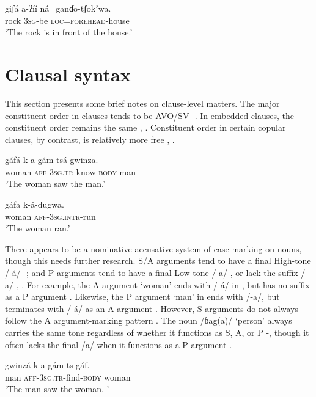 \documentclass[output=paper]{langsci/langscibook}
\begin{document}
\ea\label{ex:ahlandc:65}
\gll
giʃá   a-ʔíí    ná=ganɗo-tʃokʼwa.   \\ 
rock 3\textsc{sg}{}-be \textsc{loc}=\textsc{forehead}{}-house \\
\glt
‘The rock is in front of the house.’
\z

\section{Clausal syntax}\label{sec:ahlandc:11}

This section presents some brief notes on clause-level matters. The major constituent order in  clauses tends to be AVO/SV -. In embedded clauses, the constituent order remains the same , . Constituent order in certain copular clauses, by contrast, is relatively more free , .

\ea\label{ex:ahlandc:66}
\gll
gáfá      k-a-gám-tsá    gwinza. \\ 
woman \textsc{aff-3sg.tr}{}-know-\textsc{body}  man \\
\glt
‘The woman saw the man.’
\z

\ea\label{ex:ahlandc:67}
\gll
gáfa       k-á-dugwa. \\
 woman \textsc{aff-3sg.intr}{}-run \\
\glt
‘The woman ran.’
\z

There appears to be a nominative-accusative system of case marking on nouns, though this needs further research. S/A arguments tend to have a final High-tone /-á/ -; and P arguments tend to have a final Low-tone /-a/ , or lack the suffix /-a/ , . For example, the A argument ‘woman’ ends with /-á/ in , but has no suffix as a P argument . Likewise, the P argument ‘man’ in  ends with /-a/, but terminates with /-á/ as an A argument . However, S arguments do not always follow the A argument-marking pattern . The noun /ɓag(a)/ ‘person’ always carries the same tone regardless of whether it functions as S, A, or P -, though it often lacks the final /a/ when it functions as a P argument . 

\ea\label{ex:ahlandc:68}
\gll
gwinzá  k-a-gám-ts   gáf.  \\
man  \textsc{aff-3sg.tr}{}-find-\textsc{body}  woman \\
\glt
‘The man saw the woman. ’
\z
\end{document}
